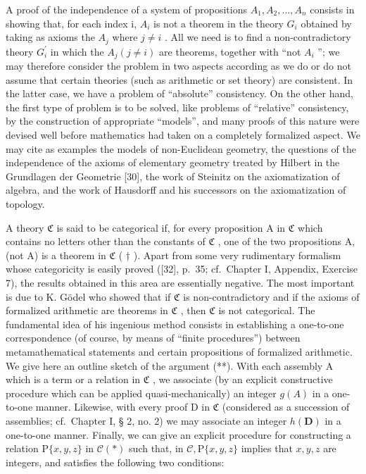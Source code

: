 A proof of the independence of a system of propositions \(A_{1}, A_{2}, \ldots, A_{n}\) consists in showing that, for each index i, \(A_{i}\) is not a theorem in the theory \(G_{i}\) obtained by taking as axioms the \(A_{j}\) where \(j \neq i\) . All we need is to find a non-contradictory theory \(G_{i}^{\prime}\) in which the \(A_{j} (j \neq i)\) are theorems, together with ``not \(A_{i}\) ''; we may therefore consider the problem in two aspects according as we do or do not assume that certain theories (such as arithmetic or set theory) are consistent. In the latter case, we have a problem of ``absolute'' consistency. On the other hand, the first type of problem is to be solved, like problems of ``relative'' consistency, by the construction of appropriate ``models'', and many proofs of this nature were devised well before mathematics had taken on a completely formalized aspect. We may cite as examples the models of non-Euclidean geometry, the questions of the independence of the axioms of elementary geometry treated by Hilbert in the Grundlagen der Geometrie {[}30{]}, the work of Steinitz on the axiomatization of algebra, and the work of Hausdorff and his successors on the axiomatization of topology.

A theory \(\mathfrak{C}\) is said to be categorical if, for every proposition A in \(\mathfrak{C}\) which contains no letters other than the constants of \(\mathfrak{C}\) , one of the two propositions A, (not A) is a theorem in \(\mathfrak{C}\) ( \(\dagger\) ). Apart from some very rudimentary formalism whose categoricity is easily proved ({[}32{]}, p.~35; cf.~Chapter I, Appendix, Exercise 7), the results obtained in this area are essentially negative. The most important is due to K. Gödel who showed that if \(\mathfrak{C}\) is non-contradictory and if the axioms of formalized arithmetic are theorems in \(\mathfrak{C}\) , then \(\mathfrak{C}\) is not categorical. The fundamental idea of his ingenious method consists in establishing a one-to-one correspondence (of course, by means of ``finite procedures'') between metamathematical statements and certain propositions of formalized arithmetic. We give here an outline sketch of the argument (**). With each assembly A which is a term or a relation in \(\mathfrak{C}\) , we associate (by an explicit constructive procedure which can be applied quasi-mechanically) an integer \(g(A)\) in a one-to-one manner. Likewise, with every proof D in \(\mathfrak{C}\) (considered as a succession of assemblies; cf.~Chapter I, § 2, no. 2) we may associate an integer \(h(\mathbf{D})\) in a one-to-one manner. Finally, we can give an explicit procedure for constructing a relation \(\mathrm{P}\{x, y, z\}\) in \(\mathcal{C} (*)\) such that, in \(\mathcal{C}, \mathrm{P}\{x, y, z\}\) implies that \(x, y, z\) are integers, and satisfies the following two conditions:

